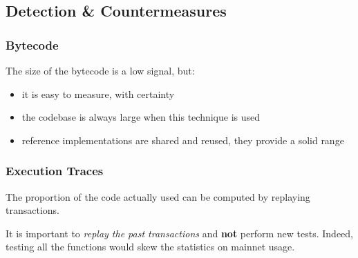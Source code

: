 \subsection{Detection \& Countermeasures}

\subsubsection{Bytecode}

The size of the bytecode is a low signal, but:

\begin{itemize}
\item{it is easy to measure, with certainty}
\item{the codebase is always large when this technique is used}
\item{reference implementations are shared and reused, they provide a solid range}
\end{itemize}

\subsubsection{Execution Traces}

The proportion of the code actually used can be computed by replaying transactions.

It is important to \emph{replay the past transactions} and \textbf{not} perform new tests.
Indeed, testing all the functions would skew the statistics on mainnet usage.

